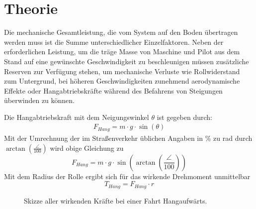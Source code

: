 \chapter{Theorie}
	Die mechanische Gesamtleistung, die vom System auf den Boden übertragen werden muss ist die Summe unterschiedlicher Einzelfaktoren.
	Neben der erforderlichen Leistung, um die träge Masse von Maschine und Pilot aus dem Stand auf eine gewünschte Geschwindigkeit zu beschleunigen müssen zusätzliche Reserven zur Verfügung stehen, um mechanische Verluste wie Rollwiderstand zum Untergrund, bei höheren Geschwindigkeiten zunehmend aerodynamische Effekte oder Hangabtriebskräfte während des Befahrens von Steigungen überwinden zu können.\par\medskip
	Die Hangabtriebskraft mit dem Neigungswinkel \(\theta\) ist gegeben durch:
	\begin{align}
		F_{Hang} = m \cdot g \cdot \sin\left(\theta\right)
		\label{eq:downhill force}
	\end{align}
	Mit der Umrechnung der im Straßenverkehr üblichen Angaben in \unit{\percent} zu \unit{\radian} durch \(\arctan\left(\frac{\angle}{100}\right)\) wird obige Gleichung zu
	\begin{equation}
		F_{Hang} = m \cdot g \cdot \sin\left(\arctan\left(\frac{\angle}{100}\right)\right)
		\label{eq:downhill force incline to radian}
	\end{equation}
	Mit dem Radius der Rolle ergibt sich für das wirkende Drehmoment unmittelbar
	\begin{equation}
		T_{Hang} = F_{Hang} \cdot r
		\label{eq:incline torque}
	\end{equation}
	\begin{figure}[h]
		\centering
		
		\caption[Skizze aller wirkenden Kräfte bei einer Fahrt Hangaufwärts]{Skizze aller wirkenden Kräfte bei einer Fahrt Hangaufwärts.}
		\label{fig:sketch torque incline}
	\end{figure}
	
